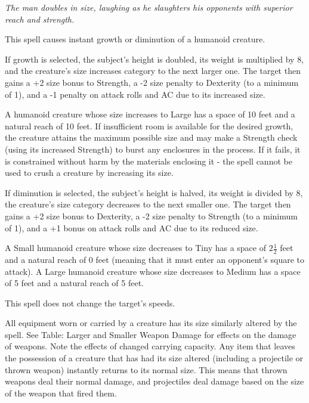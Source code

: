\emph{The man doubles in size, laughing as he slaughters his opponents with superior reach and strength.}

This spell causes instant growth or diminution of a humanoid creature. 

\begin{list}{}{\leftmargin=1em}
 \item If growth is selected, the subject's height is doubled, its weight is multiplied by 8, and the creature's size increases category to the next larger one.
The target then gains a +2 size bonus to Strength, a -2 size penalty to Dexterity (to a minimum of 1), and a -1 penalty on attack rolls and AC due to its increased size.

A humanoid creature whose size increases to Large has a space of 10 feet and a natural reach of 10 feet.
If insufficient room is available for the desired growth, the creature attains the maximum possible size and may make a Strength check (using its increased Strength) to burst any enclosures in the process. 
If it fails, it is constrained without harm by the materials enclosing it - the spell cannot be used to crush a creature by increasing its size.
 \item If diminution is selected, the subject's height is halved, its weight is divided by 8, the creature's size category decreases to the next smaller one. 
The target then gains a +2 size bonus to Dexterity, a -2 size penalty to Strength (to a minimum of 1), and a +1 bonus on attack rolls and AC due to its reduced size.

A Small humanoid creature whose size decreases to Tiny has a space of $2\frac{1}{2}$ feet and a natural reach of 0 feet 
(meaning that it must enter an opponent's square to attack). 
A Large humanoid creature whose size decreases to Medium has a space of 5 feet and a natural reach of 5 feet.
\end{list}

This spell does not change the target's speeds.

All equipment worn or carried by a creature has its size similarly altered by the spell. 
See Table: Larger and Smaller Weapon Damage for effects on the damage of weapons.
Note the effects of changed carrying capacity.
Any item that leaves the possession of a creature that has had its size altered (including a projectile or thrown weapon) instantly returns to its normal size. 
This means that thrown weapons deal their normal damage, and projectiles deal damage based on the size of the weapon that fired them. 

